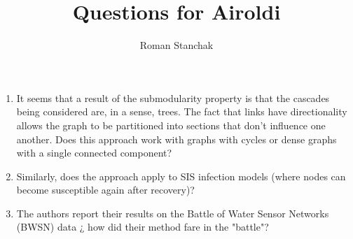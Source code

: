 \documentclass[11pt]{article}
\begin{document}
%
\title{Questions for Airoldi}
\author{Roman Stanchak}
\maketitle

\begin{enumerate}
	\item It seems that a result of the submodularity property is that the
		cascades being considered are, in a sense, trees. The fact that links
		have directionality allows the graph to be partitioned into sections
		that don't influence one another. Does this approach work with graphs
		with cycles or dense graphs with a single connected component?
	\item Similarly, does the approach apply to SIS infection models (where nodes can become susceptible again after recovery)?
	\item The authors report their results on the Battle of Water Sensor Networks (BWSN) data ¿ how did their method fare in the "battle"?
\end{enumerate}
\end{document}
